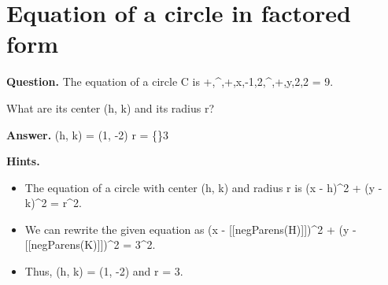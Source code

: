 \documentclass{article}
\begin{document}
\section*{Equation of a circle in factored form}
\textbf{Question.} The equation of a circle C is +,\textasciicircum{},+,x,-1,2,\textasciicircum{},+,y,2,2 = 9.

                What are its center (h, k) and its radius r?

\textbf{Answer.} (h, k) = (1, -2)
                r = \{\}3

\textbf{Hints.}
\begin{itemize}
  \item The equation of a circle with center (h, k) and radius r is (x - h)\textasciicircum{}2 + (y - k)\textasciicircum{}2 = r\textasciicircum{}2.
  \item We can rewrite the given equation as (x - [[negParens(H)]])\textasciicircum{}2 + (y - [[negParens(K)]])\textasciicircum{}2 = 3\textasciicircum{}2.
  \item Thus, (h, k) = (1, -2) and r = 3.
\end{itemize}
\end{document}
